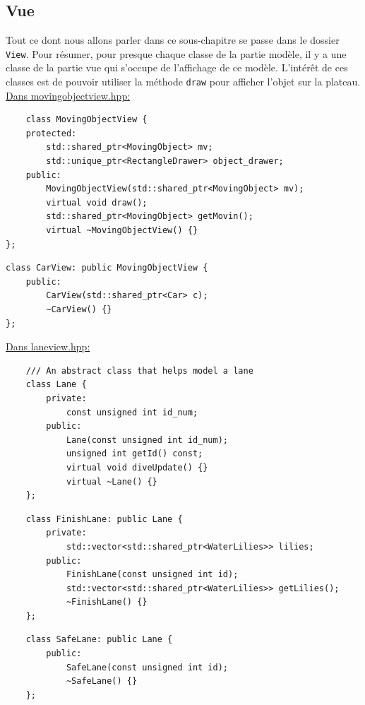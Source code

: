 \documentclass[a4paper, 12pt]{article}
\begin{document}
\subsection{Vue}

Tout ce dont nous allons parler dans ce sous-chapitre se passe dans le dossier \texttt{View}. Pour résumer, pour presque chaque classe de la partie modèle, il y a une classe de la partie vue qui s'occupe de l'affichage de ce modèle.
L'intérêt de ces classes est de pouvoir utiliser la méthode \texttt{draw} pour afficher l'objet sur la plateau. \\

\underline{Dans movingobjectview.hpp:} \hspace{0.5cm}

\begin{lstlisting}
    class MovingObjectView {
    protected:
        std::shared_ptr<MovingObject> mv;
        std::unique_ptr<RectangleDrawer> object_drawer;
    public:
        MovingObjectView(std::shared_ptr<MovingObject> mv);
        virtual void draw();
        std::shared_ptr<MovingObject> getMovin();
        virtual ~MovingObjectView() {}
};
\end{lstlisting}

\begin{lstlisting}
class CarView: public MovingObjectView {
    public:
        CarView(std::shared_ptr<Car> c);
        ~CarView() {}
};
\end{lstlisting}

\underline{Dans laneview.hpp:} \hspace{0.5cm}

\begin{lstlisting}
    /// An abstract class that helps model a lane
    class Lane {
        private:
            const unsigned int id_num;
        public:
            Lane(const unsigned int id_num);
            unsigned int getId() const;
            virtual void diveUpdate() {}
            virtual ~Lane() {}
    };
\end{lstlisting}

\begin{lstlisting}
    class FinishLane: public Lane {
        private:
            std::vector<std::shared_ptr<WaterLilies>> lilies;
        public:
            FinishLane(const unsigned int id);
            std::vector<std::shared_ptr<WaterLilies>> getLilies();
            ~FinishLane() {}
    };
\end{lstlisting}

\begin{lstlisting}
    class SafeLane: public Lane {
        public:
            SafeLane(const unsigned int id);
            ~SafeLane() {}
    };
\end{lstlisting}
\end{document}
